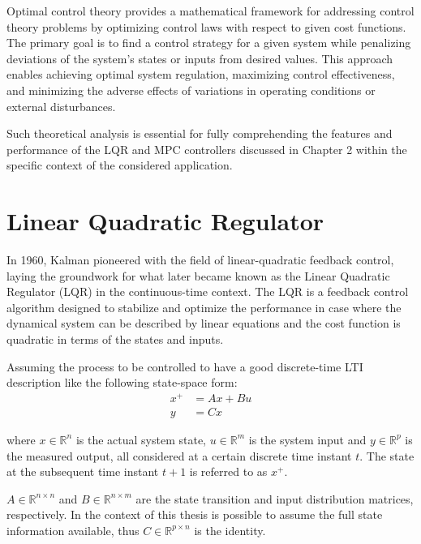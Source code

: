 \documentclass[a4paper,12pt,oneside]{book}
\begin{document}
Optimal control theory provides a mathematical framework for addressing control theory problems by optimizing control laws with respect to given cost functions. The primary goal is to find a control strategy for a given system while penalizing deviations of the system's states or inputs from desired values.
This approach enables achieving optimal system regulation, maximizing control effectiveness, and minimizing the adverse effects of variations in operating conditions or external disturbances.

Such theoretical analysis is essential for fully comprehending the features and performance of the LQR and MPC controllers discussed in Chapter 2 within the specific context of the considered application.

\section{Linear Quadratic Regulator}
In 1960, Kalman pioneered with the field of linear-quadratic feedback control, laying the groundwork for what later became known as the Linear Quadratic Regulator (LQR) \cite{kalman_contributions} in the continuous-time context. 
The LQR is a feedback control algorithm designed to stabilize and optimize the performance in case where the dynamical system can be described by linear equations and the cost function is quadratic in terms of the states and inputs. 

\bigskip
Assuming the process to be controlled to have a good discrete-time LTI description like the following state-space form:
\begin{equation} 
\begin{aligned}
    x^+ &= A x + B u \\
    y &= C x
\end{aligned}
\label{eq:Linear_model}
\end{equation}

where $x \in \mathbb{R}^n$ is the actual system state, $u \in \mathbb{R}^m$ is the system input and $y \in \mathbb{R}^p$ is the measured output, all considered at a certain discrete time instant $t$. 
The state at the subsequent time instant $t+1$ is referred to as $x^+$.

$A \in \mathbb{R}^{n\times n}$ and $B\in \mathbb{R}^{n\times m}$ are the state transition and input distribution matrices, respectively.
In the context of this thesis is possible to assume the full state information available, thus $C \in \mathbb{R}^{p\times n}$ is the identity. 
\end{document}
